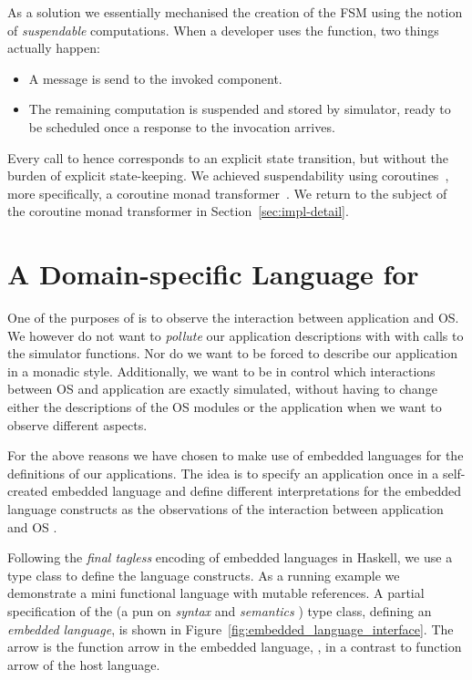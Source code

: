 As a solution we essentially mechanised the creation of the FSM using the notion of \emph{suspendable} computations.
When a developer uses the  function, two things actually happen:
\begin{itemize}
  \item A message is send to the invoked component.
  \item The remaining computation is suspended and stored by simulator, ready to be scheduled once a response to the invocation arrives.
\end{itemize}
Every call to  hence corresponds to an explicit state transition, but without the burden of explicit state-keeping.
We achieved suspendability using coroutines~\cite{coroutines}, more specifically, a coroutine monad transformer~\cite{cmt}.
We return to the subject of the coroutine monad transformer in Section~\ref{sec:impl-detail}.

\section{A Domain-specific Language for \soosim}
\label{sec:dsl}
One of the purposes of \soosim is to observe the interaction between application and OS.
We however do not want to \emph{pollute} our application descriptions with with calls to the simulator functions.
Nor do we want to be forced to describe our application in a monadic style.
Additionally, we want to be in control which interactions between OS and application are exactly simulated, without having to change either the descriptions of the OS modules or the application when we want to observe different aspects.

For the above reasons we have chosen to make use of embedded languages for the definitions of our applications.
The idea is to specify an application once in a self-created embedded language and define different interpretations for the embedded language constructs as the observations of the interaction between application and OS \cite{Hofer:2008:PED:1449913.1449935}. 

Following the \emph{final tagless} \cite{final_tagless_embedding} encoding of embedded languages in Haskell, we use a type class to define the language constructs.
As a running example we demonstrate a mini functional language with mutable references.
A partial specification of the  (a pun on \emph{syntax} and \emph{semantics} \cite{final_tagless_embedding}) type class, defining an \emph{embedded language}, is shown in Figure~\ref{fig:embedded_language_interface}.
The arrow \cd{:->} is the function arrow in the embedded language, \eg {}, in a contrast to function arrow \cd{->} of the host language.


